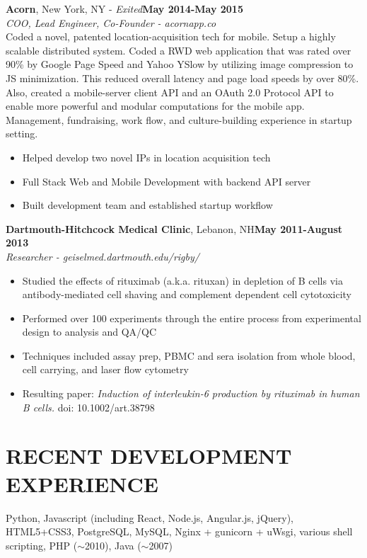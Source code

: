 \documentclass[a4paper, 10pt]{article}
\begin{document}
\noindent
{\bf Acorn}{, New York, NY - \sl Exited}\hfill {\bf May 2014-May 2015 \\}
{\sl COO, Lead Engineer, Co-Founder - acornapp.co} \\
\indent Coded a novel, patented location-acquisition tech for mobile.  Setup a highly scalable distributed system.  Coded a RWD web application that was rated over 90\% by Google Page Speed and Yahoo YSlow by utilizing image compression to JS minimization.  This reduced overall latency and page load speeds by over 80\%.  Also, created a mobile-server client API and an OAuth 2.0 Protocol API to enable more powerful and modular computations for the mobile app.  Management, fundraising, work flow, and culture-building experience in startup setting. \\[-6mm]
\begin{itemize}[leftmargin=5mm] 
\itemsep -2pt
	\item Helped develop two novel IPs in location acquisition tech
	\item Full Stack Web and Mobile Development with backend API server
	\item Built development team and established startup workflow
\end{itemize}
                 
\noindent
{\bf Dartmouth-Hitchcock Medical Clinic}{, Lebanon, NH}\hfill {\bf May 2011-August 2013 \\}
{\sl Researcher - geiselmed.dartmouth.edu/rigby/}\\[-6mm]
\begin{itemize}[leftmargin=5mm] 
\itemsep -2pt
	\item Studied the effects of rituximab (a.k.a. rituxan) in depletion of B cells via antibody-mediated cell shaving and complement dependent cell cytotoxicity
	\item Performed over 100 experiments through the entire process from experimental design to analysis and QA/QC
	\item Techniques included assay prep, PBMC and sera isolation from whole blood, cell carrying, and laser flow cytometry
	\item Resulting paper: {\sl Induction of interleukin-6 production by rituximab in human B cells.} doi: 10.1002/art.38798
\end{itemize}      
                 
\section*{RECENT DEVELOPMENT EXPERIENCE}
\vspace{-3mm}
Python, Javascript (including React, Node.js, Angular.js, jQuery), HTML5+CSS3, PostgreSQL, MySQL, Nginx + gunicorn + uWsgi, various shell scripting, PHP ($\sim$2010), Java ($\sim$2007)
                 
\end{document}
